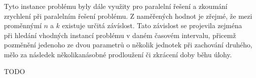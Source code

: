 \documentclass[12pt]{article}
\begin{document}

Tyto instance problému byly dále využity pro paralelní řešení a zkoumání zrychlení při paralelním řešení problému.
Z naměřených hodnot je zřejmé, že mezi proměnnýmí $n$ a $k$ existuje určitá závíslost. 
Tato závislost se projevila zejména při hledání vhodných instancí problému v daném časovém intervalu, 
přicemž pozměnění jedenoho ze dvou parametrů o několik jednotek při zachování druhého, mělo za následek
několikanásobné prodloužení či zkrácení doby běhu úlohy.


TODO

%
\end{document}
